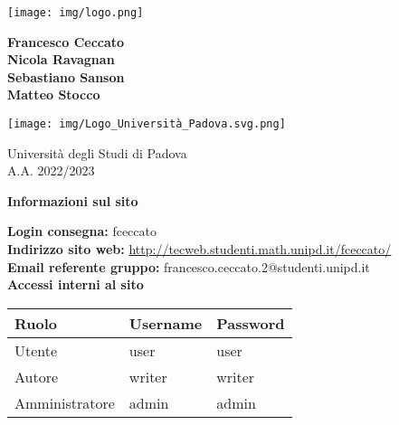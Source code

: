 \documentclass[11pt, a4paper]{article}
\begin{document}
\begin{titlepage}
    \begin{center}
        \vspace*{1cm}
        
        \texttt{[image: img/logo.png]}
            
        \vspace{0.5cm}
        
        \Large
        \textbf{Francesco Ceccato} \\
        \textbf{Nicola Ravagnan} \\
        \textbf{Sebastiano Sanson} \\
        \textbf{Matteo Stocco}
            
        \vfill
            
        \vspace{0.8cm}
            
        \texttt{[image: img/Logo\_Università\_Padova.svg.png]}
            
        \Large
        Università degli Studi di Padova \\
        A.A. 2022/2023
            
    \end{center}
\end{titlepage}


\clearpage

\begin{center}
	\textbf{\Large{Informazioni sul sito}}

    \vspace{0.5cm}

	\textbf{Login consegna:} fceccato \\
	\textbf{Indirizzo sito web:} \url{http://tecweb.studenti.math.unipd.it/fceccato/}\\
	\textbf{Email referente gruppo:} francesco.ceccato.2@studenti.unipd.it \\
    \vspace{1cm}
    \textbf{Accessi interni al sito}
    \begin{longtable}{|l|l|l|}
        \hline
        \rowcolor[HTML]{220058}
        {\color[HTML]{FFFFFF} Ruolo} & {\color[HTML]{FFFFFF} Username} & {\color[HTML]{FFFFFF} Password} \\ \hline
        Utente         & user     & user    \\ \hline
        Autore         & writer   & writer  \\ \hline
        Amministratore & admin    & admin   \\ \hline
    \end{longtable}
\end{center}

\clearpage  

\tableofcontents

\clearpage











\end{document}
